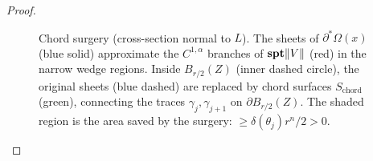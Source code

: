 \begin{proof}
\begin{figure}[ht]
    \caption{Chord surgery (cross-section normal to $L$). The sheets of $\partial^*\Omega(x)$ (blue solid) approximate the $C^{1,\alpha}$ branches of $\mathbf{spt}\|V\|$ (red) in the narrow wedge regions. Inside $B_{r/2}(Z)$ (inner dashed circle), the original sheets (blue dashed) are replaced by chord surfaces $S_{\mathrm{chord}}$ (green), connecting the traces $\gamma_j, \gamma_{j+1}$ on $\partial B_{r/2}(Z)$. The shaded region is the area saved by the surgery: $\geq \delta(\theta_j) r^n / 2 > 0$.}
    \label{fig:surgery}
\end{figure}


\end{proof}
